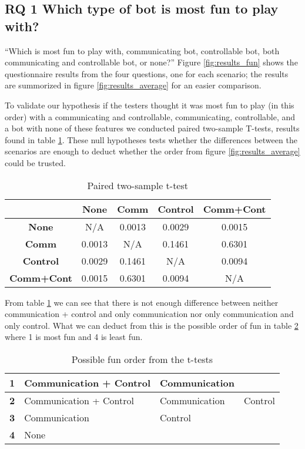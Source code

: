 \subsection{RQ 1 Which type of bot is most fun to play with?}
``Which is most fun to play with, communicating bot, controllable bot, both communicating and
controllable bot, or none?'' Figure \ref{fig:results_fun} shows the questionnaire results from the
four questions, one for each scenario; the results are summorized in figure
\ref{fig:results_average} for an easier comparison.

To validate our hypothesis if the testers thought it was most fun to play (in this order) with a communicating and
controllable, communicating, controllable, and a bot with none of these features we conducted paired two-sample
T-tests, results found in table \ref{tbl:t-test-all}. These null hypotheses tests whether the
differences between the scenarios are enough to deduct
whether the order from figure \ref{fig:results_average} could be trusted.

\begin{table}[htbp]
\begin{center}
\begin{tabular}{|c|c|c|c|c|}
\hline
 & \textbf{None} & \textbf{Comm} & \textbf{Control} & \textbf{Comm+Cont} \\ \hline
\textbf{None} & N/A & 0.0013 & 0.0029 & 0.0015 \\ \hline
\textbf{Comm} & 0.0013 & N/A & 0.1461 & 0.6301 \\ \hline
\textbf{Control} & 0.0029 & 0.1461 & N/A & 0.0094 \\ \hline
\textbf{Comm+Cont} & 0.0015 & 0.6301 & 0.0094 & N/A \\ \hline
\end{tabular}
\end{center}
\vspace{-12pt}
\caption{Paired two-sample t-test}
\label{tbl:t-test-all}
\end{table}
From table \ref{tbl:t-test-all} we can see that there is not enough difference between neither
communication + control and only communication nor only communication and only control. What we can
deduct from this is the possible order of fun in table \ref{tbl:order_fun} where 1 is most fun and 4 is
least fun.

\begin{table}[htb]
	\centering
	\begin{tabular}{|l|l|l|l|}
		\hline
		\textbf{1} & Communication + Control & Communication & \\ \hline
		\textbf{2} & Communication + Control & Communication & Control \\ \hline
		\textbf{3} & Communication & Control & \\ \hline
		\textbf{4} & None & & \\ \hline

	\end{tabular}
	\caption{Possible fun order from the t-tests}
	\label{tbl:order_fun}
\end{table}

